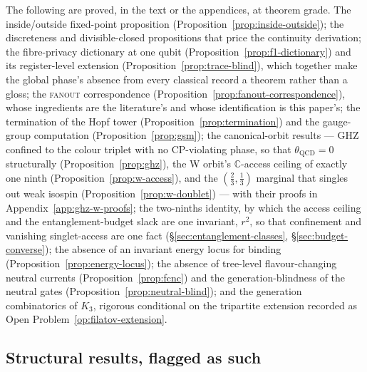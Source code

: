 The following are proved, in the text or the appendices, at theorem grade. The inside/outside
fixed-point proposition (Proposition~\ref{prop:inside-outside}); the discreteness and
divisible-closed propositions that price the continuity derivation; the fibre-privacy dictionary at
one qubit (Proposition~\ref{prop:f1-dictionary}) and its register-level extension
(Proposition~\ref{prop:trace-blind}), which together make the global phase's absence from every
classical record a theorem rather than a gloss; the \textsc{fanout} correspondence
(Proposition~\ref{prop:fanout-correspondence}), whose ingredients are the literature's and whose
identification is this paper's; the termination of the Hopf tower
(Proposition~\ref{prop:termination}) and the gauge-group computation (Proposition~\ref{prop:gsm});
the canonical-orbit results --- GHZ confined to the colour triplet with no CP-violating phase, so
that $\theta_{\mathrm{QCD}} = 0$ structurally (Proposition~\ref{prop:ghz}), the W orbit's
$\mathbb{C}$-access ceiling of exactly one ninth (Proposition~\ref{prop:w-access}), and the
$(\tfrac23, \tfrac13)$ marginal that singles out weak isospin (Proposition~\ref{prop:w-doublet}) ---
with their proofs in Appendix~\ref{app:ghz-w-proofs}; the two-ninths identity, by which the access
ceiling and the entanglement-budget slack are one invariant, $r^{2}$, so that confinement and
vanishing singlet-access are one fact (\S\ref{sec:entanglement-classes},
\S\ref{sec:budget-converse}); the absence of an invariant energy locus for binding
(Proposition~\ref{prop:energy-locus}); the absence of tree-level flavour-changing neutral currents
(Proposition~\ref{prop:fcnc}) and the generation-blindness of the neutral gates
(Proposition~\ref{prop:neutral-blind}); and the generation combinatorics of $K_3$, rigorous
conditional on the tripartite extension recorded as Open Problem~\ref{op:filatov-extension}.

\subsection{Structural results, flagged as such}

